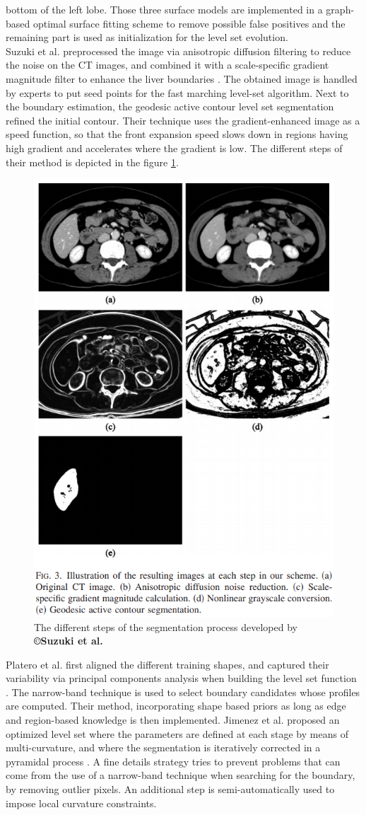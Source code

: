 \documentclass[]{article}
\begin{document}
	bottom of the left lobe. Those three surface models are implemented in a
	graph-based optimal surface fitting scheme to remove possible false
	positives and the remaining part is used as initialization for the level
	set evolution.\\
	Suzuki et al. preprocessed the image via anisotropic diffusion
	filtering to reduce the noise on the CT images, and combined it with a
	scale-specific gradient magnitude filter to enhance the liver
	boundaries \cite{Suzuki2010}. The obtained image is handled by experts to put seed points
	for the fast marching level-set algorithm. Next to the boundary
	estimation, the geodesic active contour level set segmentation refined
	the initial contour. Their technique uses the gradient-enhanced image as
	a speed function, so that the front expansion speed slows down in
	regions having high gradient and accelerates where the gradient is low.
	The different steps of their method is depicted in the figure \ref{Suzuki2010_Fig3}.
	
	\begin{figure}[ht!]
		\centering
		\includegraphics[width=0.5\linewidth]{images/image24}
		\caption{The different steps of the segmentation process developed by \textbf{©Suzuki et al.} \cite{Suzuki2010}}
		\label{Suzuki2010_Fig3}
	\end{figure}
	
	
	Platero et al. first aligned the different training shapes, and captured
	their variability via principal components analysis when building the
	level set function \cite{Platero2011}. The narrow-band technique is used to select boundary
	candidates whose profiles are computed. Their method, incorporating
	shape based priors as long as edge and region-based knowledge is then
	implemented.
	Jimenez et al. proposed an optimized level set where the parameters are
	defined at each stage by means of multi-curvature, and where the
	segmentation is iteratively corrected in a pyramidal process \cite{Jimenez-Carretero2011}. A fine
	details strategy tries to prevent problems that can come from the use of
	a narrow-band technique when searching for the boundary, by removing
	outlier pixels. An additional step is semi-automatically used to impose
	local curvature constraints.
	
\end{document}
